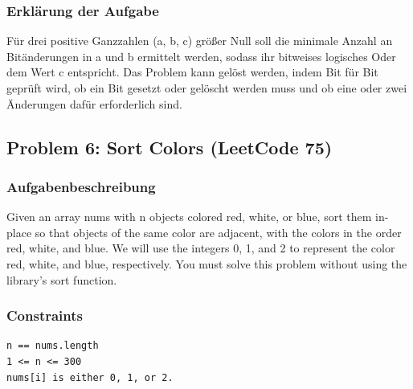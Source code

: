 \subsubsection*{Erklärung der Aufgabe}
Für drei positive Ganzzahlen (a, b, c) größer Null soll die minimale Anzahl an Bitänderungen in a und b ermittelt 
werden, sodass ihr bitweises logisches Oder dem Wert c entspricht. Das Problem kann gelöst werden, indem Bit für Bit geprüft wird, ob ein Bit gesetzt oder gelöscht werden muss 
und ob eine oder zwei Änderungen dafür erforderlich sind.

\clearpage

\subsection{Problem 6: Sort Colors (LeetCode 75)}

\subsubsection*{Aufgabenbeschreibung}
Given an array nums with n objects colored red, white, or blue, sort them in-place so that objects of the same color are adjacent, with the colors in the order red, white, and blue.
We will use the integers 0, 1, and 2 to represent the color red, white, and blue, respectively.
You must solve this problem without using the library's sort function.

\subsubsection*{Constraints}
\begin{lstlisting}[style=appendixdata]
n == nums.length
1 <= n <= 300
nums[i] is either 0, 1, or 2.
\end{lstlisting}

